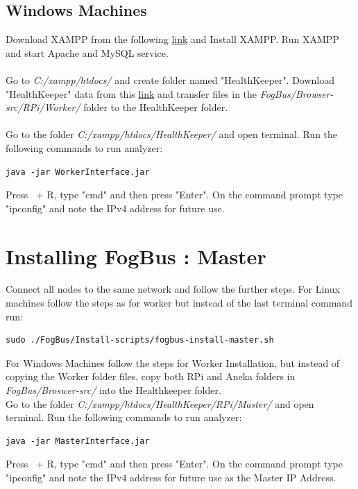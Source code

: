 \documentclass{article}
\begin{document}
\subsection{Windows Machines}
Download XAMPP from the following \href{https://www.apachefriends.org/xampp-files/7.2.6/xampp-win32-7.2.6-0-VC15-installer.exe}{link} and Install XAMPP. Run XAMPP and start Apache and MySQL service.\\ \\
Go to \textit{C:/xampp/htdocs/} and create folder named "HealthKeeper". Download "HealthKeeper" data from this \href{https://drive.google.com/open?id=1DZWaJHHNMrJFnsCfxoWSIpfDhK7n-qHH}{link} and transfer files in the \textit{FogBus/Browser-src/RPi/Worker/} folder to the HealthKeeper folder.\\ \\
Go to the folder \textit{C:/xampp/htdocs/HealthKeeper/} and open terminal. Run the following commands to run analyzer:
\begin{lstlisting}[style=BashInputStyle]
    java -jar WorkerInterface.jar
\end{lstlisting}
Press \faWindows \ + R, type "cmd" and then press "Enter". On the command prompt type "ipconfig" and note the IPv4 address for future use.

\section{Installing FogBus : Master}

Connect all nodes to the same network and follow the further steps. For Linux machines follow the steps as for worker but instead of the last terminal command run:
\begin{lstlisting}[style=BashInputStyle]
    sudo ./FogBus/Install-scripts/fogbus-install-master.sh
\end{lstlisting}

For Windows Machines follow the steps for Worker Installation, but instead of copying the Worker folder files, copy both RPi and Aneka folders in \textit{FogBus/Broswer-src/} into the Healthkeeper folder.\\Go to the folder \textit{C:/xampp/htdocs/HealthKeeper/RPi/Master/} and open terminal. Run the following commands to run analyzer:
\begin{lstlisting}[style=BashInputStyle]
    java -jar MasterInterface.jar
\end{lstlisting}
Press \faWindows \ + R, type "cmd" and then press "Enter". On the command prompt type "ipconfig" and note the IPv4 address for future use as the Master IP Address.
\end{document}
